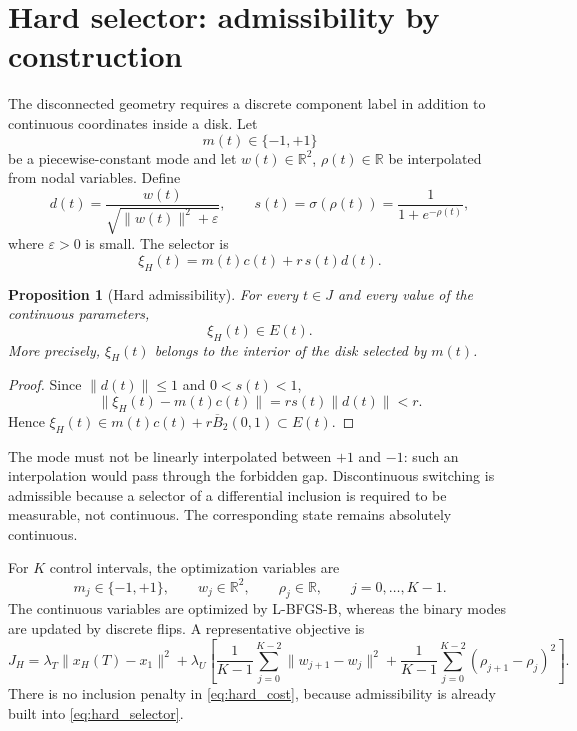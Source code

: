 \documentclass[11pt]{article}
\newtheorem{proposition}{Proposition}[section]
\newcommand{\R}{\mathbb{R}}
\newcommand{\B}{\overline{B}_2(0,1)}
\begin{document}
\section{Hard selector: admissibility by construction}

The disconnected geometry requires a discrete component label in addition to continuous coordinates inside a disk. Let
\begin{equation}
    m(t)\in\{-1,+1\}
\end{equation}
be a piecewise-constant mode and let $w(t)\in\R^2$, $\rho(t)\in\R$ be interpolated from nodal variables. Define
\begin{equation}
    d(t)=\frac{w(t)}{\sqrt{\lVert w(t)\rVert^2+\varepsilon}},
    \qquad
    s(t)=\sigma(\rho(t))=\frac{1}{1+e^{-\rho(t)}},
    \label{eq:hard_local}
\end{equation}
where $\varepsilon>0$ is small. The selector is
\begin{equation}
    \xi_H(t)=m(t)c(t)+r\,s(t)d(t).
    \label{eq:hard_selector}
\end{equation}

\begin{proposition}[Hard admissibility]
For every $t\in J$ and every value of the continuous parameters,
\begin{equation}
    \xi_H(t)\in E(t).
\end{equation}
More precisely, $\xi_H(t)$ belongs to the interior of the disk selected by $m(t)$.
\end{proposition}

\begin{proof}
Since $\lVert d(t)\rVert\leq 1$ and $0<s(t)<1$,
\begin{equation}
    \lVert \xi_H(t)-m(t)c(t)\rVert
    =r s(t)\lVert d(t)\rVert<r.
\end{equation}
Hence $\xi_H(t)\in m(t)c(t)+r\B\subset E(t)$.
\end{proof}

The mode must not be linearly interpolated between $+1$ and $-1$: such an interpolation would pass through the forbidden gap. Discontinuous switching is admissible because a selector of a differential inclusion is required to be measurable, not continuous. The corresponding state remains absolutely continuous.

For $K$ control intervals, the optimization variables are
\begin{equation}
    m_j\in\{-1,+1\},\qquad
    w_j\in\R^2,\qquad
    \rho_j\in\R,
    \qquad j=0,\ldots,K-1.
\end{equation}
The continuous variables are optimized by L-BFGS-B, whereas the binary modes are updated by discrete flips. A representative objective is
\begin{equation}
    J_H
    =\lambda_T\lVert x_H(T)-x_1\rVert^2
    +\lambda_U\left[
    \frac{1}{K-1}\sum_{j=0}^{K-2}\lVert w_{j+1}-w_j\rVert^2
    +\frac{1}{K-1}\sum_{j=0}^{K-2}(\rho_{j+1}-\rho_j)^2
    \right].
    \label{eq:hard_cost}
\end{equation}
There is no inclusion penalty in \eqref{eq:hard_cost}, because admissibility is already built into \eqref{eq:hard_selector}.
\end{document}

